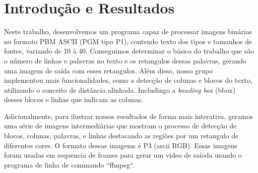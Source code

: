 \documentclass[english, 
               brazil, 
               bsc] %
               {dcomp-abntex2}
\begin{document}


\frenchspacing 




\pretextual




\orientador{}
\coorientador{}







%
%
\imprimircapa
%  
%     
\mostrarSUMARIO




\textual


\chapter{Introdução e Resultados} \label{introduction}

Neste trabalho, desenvolvemos um programa capaz de processar imagens binárias no formato PBM ASCII (PGM tipo P1), contendo texto dos tipos e tamanhos de fontes, variando de 10 à 40. Conseguimos determinar o básico do trabalho que são o número de linhas e palavras no texto e os retangulos dessas palavras, gerando uma imagem de saída com esses retangulos. Além disso, nosso grupo implementou mais funcionalidades, como a detecção de colunas e blocos do texto, utilizando o conceito de distância alinhada. Includingo a \textit{bouding box} (bbox) desses blocos e linhas que indicam as colunas.

Adicionalmente, para ilustrar nossos resultados de forma mais interativa, geramos uma série de imagens intermediárias que mostram o processo de detecção de blocos, colunas, palavras, e linhas destacando as regiões por um retangulo de diferentes cores. O formato dessas imagems é P3 (ascii RGB).
Essas imagens foram usadas em sequencia de frames para gerar um video de saíoda usando o programa de linha de commando ``ffmpeg``.
\end{document}
